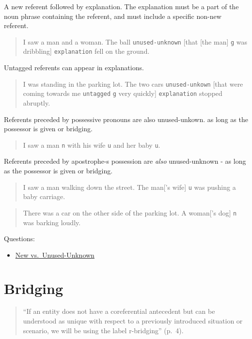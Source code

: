 \documentclass[
]{book}
\providecommand{\tightlist}{%
  \setlength{\itemsep}{0pt}\setlength{\parskip}{0pt}}
\begin{document}
A new referent followed by explanation.
The explanation must be a part of the noun phrase containing the referent, and must include a specific non-new referent.

\begin{quote}
I saw a man and a woman.
The ball \texttt{unused-unknown} {[}that {[}the man{]} \texttt{g} was dribbling{]} \texttt{explanation} fell on the ground.
\end{quote}

Untagged referents can appear in explanations.

\begin{quote}
I was standing in the parking lot.
The two cars \texttt{unused-unkown} {[}that were coming towards me \texttt{untagged} \texttt{g} very quickly{]} \texttt{explanation} stopped abruptly.
\end{quote}

Referents preceded by possessive pronouns are also unused-unkown.
as long as the possessor is given or bridging.

\begin{quote}
I saw a man \texttt{n} with his wife \texttt{u} and her baby \texttt{u}.
\end{quote}

Referents preceded by apostrophe-s possession are \emph{also} unused-unknown -
as long as the possessor is given or bridging.

\begin{quote}
I saw a man walking down the street.
The man{[}'s wife{]} \texttt{u} was pushing a baby carriage.
\end{quote}

\begin{quote}
There was a car on the other side of the parking lot.
A woman{[}'s dog{]} \texttt{n} was barking loudly.
\end{quote}

Questions:

\begin{itemize}
\tightlist
\item
  \protect\hyperlink{new-vs.-unused-unknown}{New vs.~Unused-Unknown}
\end{itemize}

\hypertarget{bridging}{%
\section{Bridging}\label{bridging}}

\begin{quote}
``If an entity does not have a coreferential antecedent but can be understood as unique with respect to a previously introduced situation or scenario, we will be using the label r-bridging'' (p.~4).
\end{quote}
\end{document}
